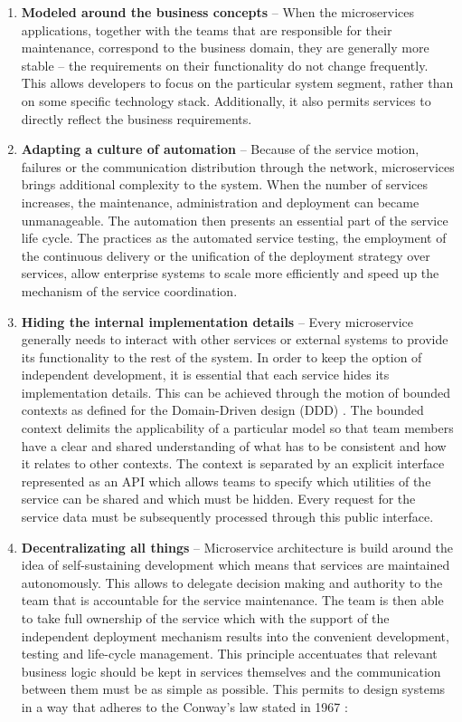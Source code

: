 \documentclass[oneside,
  digital, %
  table,   %
  nolof,     %
  nolot,     %
]{fithesis3}
\begin{document}
\begin{enumerate}
	
	\item \textbf{Modeled around the business concepts} -- When the  microservices applications, together with the teams that are responsible for their maintenance, correspond to the business domain, they are generally more stable -- the requirements on their functionality do not change frequently. This allows developers to focus on the particular system segment, rather than on some specific technology stack. Additionally, it also permits services to directly reflect the business requirements.
	
	\item \textbf{Adapting a culture of automation} -- Because of the  service motion, failures or the communication distribution through the network, microservices brings additional complexity to the system. When the number of services increases, the maintenance, administration and deployment can became unmanageable. The automation then presents an essential part of the service life cycle. The practices as the automated service testing, the employment of the continuous delivery or the unification of the deployment strategy over services, allow enterprise systems to scale more efficiently and speed up the mechanism of the service coordination.
	
	\item \textbf{Hiding the internal implementation details} -- Every microservice generally needs to interact with other services or external systems to provide its functionality to the rest of the system. In order to keep the option of independent development, it is essential that each service hides its implementation details. This can be achieved through the motion of bounded contexts as defined for the Domain-Driven design (DDD) \cite{ddd}. The bounded context delimits the applicability of a particular model so that team members have a clear and shared understanding of what has to be consistent and how it relates to other contexts. The context is separated by an explicit interface represented as an API which allows teams to specify which utilities of the service can be shared and which must be hidden. Every request for the service data must be subsequently processed through this public interface.
	
	\item \textbf{Decentralizating all things} -- Microservice architecture is build around the idea of self-sustaining development which means that services are maintained autonomously. This allows to delegate decision making and authority to the team that is accountable for the service maintenance. The team is then able to take full ownership of the service which with the support of the independent deployment mechanism results into the convenient development, testing and life-cycle management. This principle accentuates that relevant business logic should be kept in services themselves and the communication between them must be as simple as possible. This permits to design systems in a way that adheres to the Conway's law  stated in 1967 \cite{conways_law}:
    

\end{enumerate}
\end{document}
